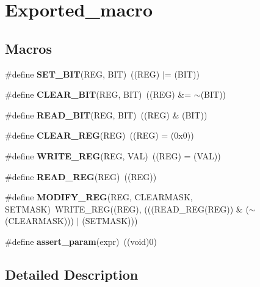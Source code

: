 \hypertarget{group___exported__macro}{\section{Exported\-\_\-macro}
\label{group___exported__macro}
}
\subsection*{Macros}
\begin{DoxyCompactItemize}
\item 
\hypertarget{group___exported__macro_ga26474f43799fbade9cf300e21dd3a91a}{\#define {\bfseries S\-E\-T\-\_\-\-B\-I\-T}(R\-E\-G, B\-I\-T)~((R\-E\-G) $|$= (B\-I\-T))}\label{group___exported__macro_ga26474f43799fbade9cf300e21dd3a91a}

\item 
\hypertarget{group___exported__macro_ga133aae6fc0d41bffab39ab223a7001de}{\#define {\bfseries C\-L\-E\-A\-R\-\_\-\-B\-I\-T}(R\-E\-G, B\-I\-T)~((R\-E\-G) \&= $\sim$(B\-I\-T))}\label{group___exported__macro_ga133aae6fc0d41bffab39ab223a7001de}

\item 
\hypertarget{group___exported__macro_ga822bb1bb9710d5f2fa6396b84e583c33}{\#define {\bfseries R\-E\-A\-D\-\_\-\-B\-I\-T}(R\-E\-G, B\-I\-T)~((R\-E\-G) \& (B\-I\-T))}\label{group___exported__macro_ga822bb1bb9710d5f2fa6396b84e583c33}

\item 
\hypertarget{group___exported__macro_ga1378fbdda39f40b85420df55f41460ef}{\#define {\bfseries C\-L\-E\-A\-R\-\_\-\-R\-E\-G}(R\-E\-G)~((R\-E\-G) = (0x0))}\label{group___exported__macro_ga1378fbdda39f40b85420df55f41460ef}

\item 
\hypertarget{group___exported__macro_ga32f78bffcaf6d13023dcd7f05e0c4d57}{\#define {\bfseries W\-R\-I\-T\-E\-\_\-\-R\-E\-G}(R\-E\-G, V\-A\-L)~((R\-E\-G) = (V\-A\-L))}\label{group___exported__macro_ga32f78bffcaf6d13023dcd7f05e0c4d57}

\item 
\hypertarget{group___exported__macro_gae7f188a4d26c9e713a48414783421071}{\#define {\bfseries R\-E\-A\-D\-\_\-\-R\-E\-G}(R\-E\-G)~((R\-E\-G))}\label{group___exported__macro_gae7f188a4d26c9e713a48414783421071}

\item 
\hypertarget{group___exported__macro_ga6553c99f510c3bab8cc0a91602053247}{\#define {\bfseries M\-O\-D\-I\-F\-Y\-\_\-\-R\-E\-G}(R\-E\-G, C\-L\-E\-A\-R\-M\-A\-S\-K, S\-E\-T\-M\-A\-S\-K)~W\-R\-I\-T\-E\-\_\-\-R\-E\-G((R\-E\-G), (((R\-E\-A\-D\-\_\-\-R\-E\-G(R\-E\-G)) \& ($\sim$(C\-L\-E\-A\-R\-M\-A\-S\-K))) $|$ (S\-E\-T\-M\-A\-S\-K)))}\label{group___exported__macro_ga6553c99f510c3bab8cc0a91602053247}

\item 
\hypertarget{group___exported__macro_ga631dea7b230e600555f979c62af1de21}{\#define {\bfseries assert\-\_\-param}(expr)~((void)0)}\label{group___exported__macro_ga631dea7b230e600555f979c62af1de21}

\end{DoxyCompactItemize}


\subsection{Detailed Description}

